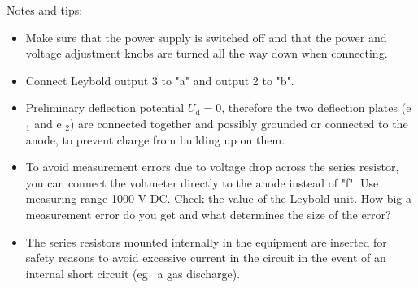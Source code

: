 \documentclass[../Elmag-labhefte-2020.tex]{subfiles}
\begin{document}
Notes and tips:
\vspace{-4mm}
\begin{itemize}
    \item Make sure that the power supply is switched off and that the power and voltage adjustment knobs are turned all the way down when connecting.
    \item Connect Leybold output 3 to "a" and output 2 to "b".
    \item Preliminary deflection potential $U_\mathrm{d} = 0$, therefore the two deflection plates (e $_1$ and e $_2$) are connected together and possibly grounded or connected to the anode, to prevent charge from building up on them.
    \item To avoid measurement errors due to voltage drop across the series resistor, you can connect the voltmeter directly to the anode instead of "f". Use measuring range 1000 V DC. Check the value of the Leybold unit. How big a measurement error do you get and what determines the size of the error?
    \item The series resistors mounted internally in the equipment are inserted for safety reasons to avoid excessive current in the circuit in the event of an internal short circuit (eg \ a gas discharge).
\end{itemize}
 








\end{document}
